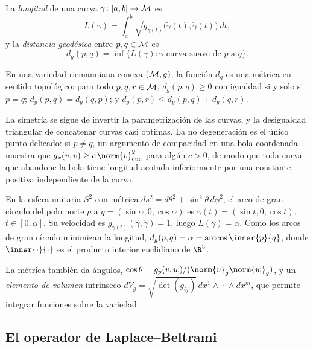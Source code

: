 \begin{definition}
\label{def:geo:distance}
La \emph{longitud} de una curva $\gamma \colon [a,b] \to \mathcal{M}$ es
\[
  L(\gamma) = \int_a^b \sqrt{g_{\gamma(t)}\big(\dot\gamma(t), \dot\gamma(t)\big)}\, dt ,
\]
y la \emph{distancia geod\'esica} entre $p, q \in \mathcal{M}$ es
\[
  d_g(p,q) = \inf\{ L(\gamma) : \gamma \text{ curva suave de } p \text{ a } q\} .
\]
\end{definition}

\begin{proposition}
\label{prop:geo:dg-metric}
En una variedad riemanniana conexa $(\mathcal{M}, g)$, la funci\'on $d_g$ es una
m\'etrica en sentido topol\'ogico: para todo $p, q, r \in \mathcal{M}$,
$d_g(p,q) \ge 0$ con igualdad si y solo si $p = q$; $d_g(p,q) = d_g(q,p)$; y
$d_g(p,r) \le d_g(p,q) + d_g(q,r)$.
\end{proposition}

La simetr\'ia se sigue de invertir la parametrizaci\'on de las curvas, y la
desigualdad triangular de concatenar curvas casi \'optimas. La no degeneraci\'on
es el \'unico punto delicado: si $p \neq q$, un argumento de compacidad en una
bola coordenada muestra que $g_x(v,v) \ge c\,\norm{v}_{\mathrm{euc}}^2$ para
alg\'un $c > 0$, de modo que toda curva que abandone la bola tiene longitud
acotada inferiormente por una constante positiva independiente de la curva.

\begin{example}
\label{ex:geo:sphere-distance}
En la esfera unitaria $S^2$ con m\'etrica $ds^2 = d\theta^2 + \sin^2\theta\,
d\phi^2$, el arco de gran c\'irculo del polo norte $p$ a
$q = (\sin\alpha, 0, \cos\alpha)$ es $\gamma(t) = (\sin t, 0, \cos t)$,
$t \in [0,\alpha]$. Su velocidad es $g_{\gamma(t)}(\dot\gamma, \dot\gamma) = 1$,
luego $L(\gamma) = \alpha$. Como los arcos de gran c\'irculo minimizan la
longitud, $d_g(p,q) = \alpha = \arccos\inner{p}{q}$, donde
$\inner{\cdot}{\cdot}$ es el producto interior euclidiano de $\R^3$.
\end{example}

La m\'etrica tambi\'en da \'angulos, $\cos\theta = g_p(v,w) /
(\norm{v}_g \norm{w}_g)$, y un \emph{elemento de volumen} intr\'inseco
$dV_g = \sqrt{\det(g_{ij})}\, dx^1 \wedge \cdots \wedge dx^m$, que permite
integrar funciones sobre la variedad.

\subsection{El operador de Laplace--Beltrami}
\label{subsec:geo:laplacian}

